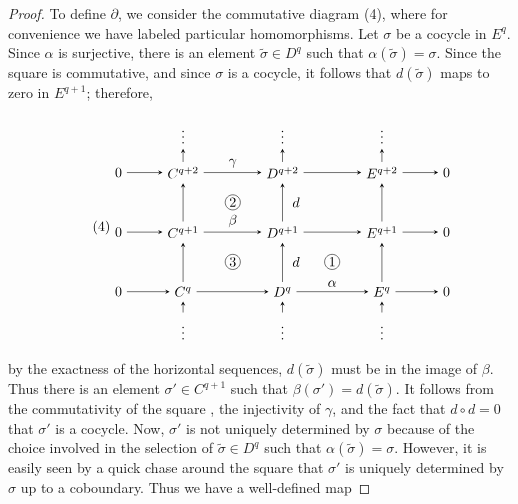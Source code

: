 \begin{proof}
To define $\partial$, we consider the commutative diagram (4), where for convenience we have labeled particular homomorphisms. Let $\sigma$ be a cocycle in $E^q$. Since $\alpha$ is surjective, there is an element $\tilde{\sigma} \in D^q$ such that $\alpha(\tilde{\sigma}) = \sigma$. Since the square  is commutative, and since $\sigma$ is a cocycle, it follows that $d(\tilde{\sigma})$ maps to zero in $E^{q+1}$; therefore,



\begin{equation}
\tag{4}\label{eq:5.17:4}
\begin{tikzpicture}[baseline={(current bounding box.center)},>=stealth,scale=1.25]
\node (zLq) at (-1.3,0) {$0$};   \node (Cq) at (0,0) {$C^{q}$};     \node (Dq) at (2,0) {$D^{q}$};     \node (Eq) at (4,0) {$E^{q}$};     \node (zRq) at (5.3,0) {$0$};
\node (zLu) at (-1.3,1.2) {$0$}; \node (Cu) at (0,1.2) {$C^{q+1}$}; \node (Du) at (2,1.2) {$D^{q+1}$}; \node (Eu) at (4,1.2) {$E^{q+1}$}; \node (zRu) at (5.3,1.2) {$0$};
\node (zLv) at (-1.3,2.4) {$0$}; \node (Cv) at (0,2.4) {$C^{q+2}$}; \node (Dv) at (2,2.4) {$D^{q+2}$}; \node (Ev) at (4,2.4) {$E^{q+2}$}; \node (zRv) at (5.3,2.4) {$0$};
\foreach \A/\B in {zLq/Cq,Cq/Dq,Dq/Eq,Eq/zRq,zLu/Cu,Cu/Du,Du/Eu,Eu/zRu,zLv/Cv,Cv/Dv,Dv/Ev,Ev/zRv}{\draw[->] (\A) -- (\B);}
\foreach \A/\B in {Cq/Cu,Cu/Cv,Dq/Du,Du/Dv,Eq/Eu,Eu/Ev}{\draw[->] (\A) -- (\B);}
\foreach \N in {Cq,Dq,Eq}{\node at (\N |- 0,-0.75) {$\vdots$}; \draw[->] (\N |- 0,-0.42) -- (\N);}
\foreach \N in {Cv,Dv,Ev}{\node at (\N |- 0,3.2) {$\vdots$}; \draw[->] (\N) -- (\N |- 0,2.88);}
\node[above] at (1,2.4) {$\gamma$};
\node[above] at (1,1.2) {$\beta$};
\node[above] at (3,0) {$\alpha$};
\node[right] at (2.1,0.6) {$d$};
\node[right] at (2.1,1.8) {$d$};
\node at (3,0.6) {\circled{1}};
\node at (1,0.6) {\circled{3}};
\node at (1,1.8) {\circled{2}};
\end{tikzpicture}
\end{equation}

by the exactness of the horizontal sequences, $d(\tilde{\sigma})$ must be in the image of $\beta$. Thus there is an element $\sigma'\in C^{q+1}$ such that $\beta(\sigma')=d(\tilde{\sigma})$. It follows from the commutativity of the square , the injectivity of $\gamma$, and the fact that $d\circ d=0$ that $\sigma'$ is a cocycle. Now, $\sigma'$ is not uniquely determined by $\sigma$ because of the choice involved in the selection of $\tilde{\sigma}\in D^{q}$ such that $\alpha(\tilde{\sigma})=\sigma$. However, it is easily seen by a quick chase around the square  that $\sigma'$ is uniquely determined by $\sigma$ up to a coboundary. Thus we have a well-defined map


\end{proof}
